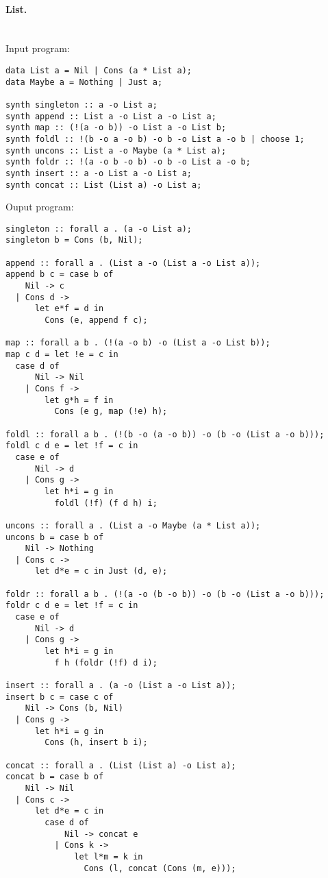 \documentclass{llncs}
\newcommand{\mypara}[1]{\paragraph{\textbf{#1}.}}
\begin{document}
\mypara{List}\
\\
Input program:
\begin{verbatim}
data List a = Nil | Cons (a * List a);
data Maybe a = Nothing | Just a;

synth singleton :: a -o List a;
synth append :: List a -o List a -o List a;
synth map :: (!(a -o b)) -o List a -o List b;
synth foldl :: !(b -o a -o b) -o b -o List a -o b | choose 1;
synth uncons :: List a -o Maybe (a * List a);
synth foldr :: !(a -o b -o b) -o b -o List a -o b;
synth insert :: a -o List a -o List a;
synth concat :: List (List a) -o List a;
\end{verbatim}
Ouput program:
\begin{verbatim}
singleton :: forall a . (a -o List a);
singleton b = Cons (b, Nil);

append :: forall a . (List a -o (List a -o List a));
append b c = case b of
    Nil -> c
  | Cons d ->
      let e*f = d in
        Cons (e, append f c);

map :: forall a b . (!(a -o b) -o (List a -o List b));
map c d = let !e = c in
  case d of
      Nil -> Nil
    | Cons f ->
        let g*h = f in
          Cons (e g, map (!e) h);

foldl :: forall a b . (!(b -o (a -o b)) -o (b -o (List a -o b)));
foldl c d e = let !f = c in
  case e of
      Nil -> d
    | Cons g ->
        let h*i = g in
          foldl (!f) (f d h) i;

uncons :: forall a . (List a -o Maybe (a * List a));
uncons b = case b of
    Nil -> Nothing
  | Cons c ->
      let d*e = c in Just (d, e);

foldr :: forall a b . (!(a -o (b -o b)) -o (b -o (List a -o b)));
foldr c d e = let !f = c in
  case e of
      Nil -> d
    | Cons g ->
        let h*i = g in
          f h (foldr (!f) d i);

insert :: forall a . (a -o (List a -o List a));
insert b c = case c of
    Nil -> Cons (b, Nil)
  | Cons g ->
      let h*i = g in
        Cons (h, insert b i);

concat :: forall a . (List (List a) -o List a);
concat b = case b of
    Nil -> Nil
  | Cons c ->
      let d*e = c in
        case d of
            Nil -> concat e
          | Cons k ->
              let l*m = k in
                Cons (l, concat (Cons (m, e)));
\end{verbatim}
\end{document}

